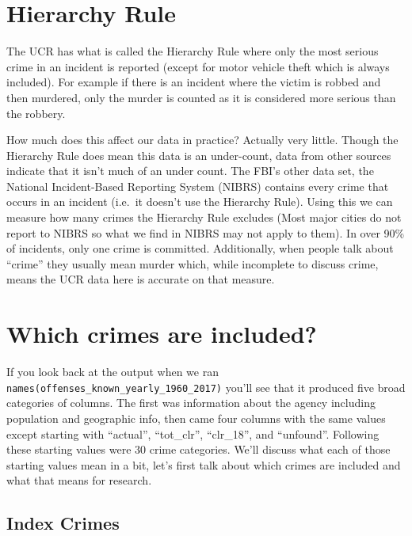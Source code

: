 \documentclass[
  12pt,
  openany]{book}
\begin{document}
\hypertarget{hierarchy-rule}{%
\section{Hierarchy Rule}\label{hierarchy-rule}}

The UCR has what is called the Hierarchy Rule where only the most serious crime in an incident is reported (except for motor vehicle theft which is always included). For example if there is an incident where the victim is robbed and then murdered, only the murder is counted as it is considered more serious than the robbery.

How much does this affect our data in practice? Actually very little. Though the Hierarchy Rule does mean this data is an under-count, data from other sources indicate that it isn't much of an under count. The FBI's other data set, the National Incident-Based Reporting System (NIBRS) contains every crime that occurs in an incident (i.e.~it doesn't use the Hierarchy Rule). Using this we can measure how many crimes the Hierarchy Rule excludes (Most major cities do not report to NIBRS so what we find in NIBRS may not apply to them). In over 90\% of incidents, only one crime is committed. Additionally, when people talk about ``crime'' they usually mean murder which, while incomplete to discuss crime, means the UCR data here is accurate on that measure.

\hypertarget{which-crimes-are-included}{%
\section{Which crimes are included?}\label{which-crimes-are-included}}

If you look back at the output when we ran \texttt{names(offenses\_known\_yearly\_1960\_2017)} you'll see that it produced five broad categories of columns. The first was information about the agency including population and geographic info, then came four columns with the same values except starting with ``actual'', ``tot\_clr'', ``clr\_18'', and ``unfound''. Following these starting values were 30 crime categories. We'll discuss what each of those starting values mean in a bit, let's first talk about which crimes are included and what that means for research.

\hypertarget{index-crimes-1}{%
\subsection{Index Crimes}\label{index-crimes-1}}
\end{document}
